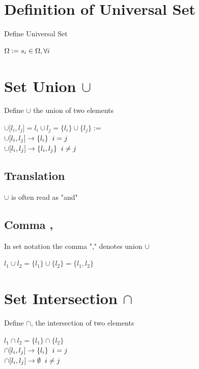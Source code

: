 \documentclass[11pt]{article}
\begin{document}
\section{Definition of Universal Set}
Define Universal Set
\begin{center}
$
\Omega := s_i \in \Omega, \forall i \hspace{5mm}
$
\end{center}





\section{Set Union $\cup$}
Define $\cup$ the union of two elements
\begin{center}
$\cup \lbrack l_i,l_j\rbrack = l_i \cup l_j = \{l_i\} \cup \{l_j\} :=$
\\ \vspace{2mm}
$\cup \lbrack l_i,l_j\rbrack \rightarrow \{l_i\} \hspace{2mm} i = j$
\\
$\cup \lbrack l_i,l_j\rbrack \rightarrow \{l_i,l_j\} \hspace{2mm} i \neq j$
\end{center}

\subsection{Translation}
$\cup$ is often read as "and"

\subsection{Comma ,}
In set notation the comma "," denotes union $\cup$
\begin{center}
$l_1 \cup l_2 = \{l_1\} \cup \{l_2\} = \{l_1,l_2\}$
\end{center}





\section{Set Intersection $\cap$}
Define $\cap$, the intersection of two elements
\begin{center}
$l_1 \cap l_2 = \{l_1\} \cap\{ l_2\}$
\\ \vspace{2mm}
$\cap \lbrack l_i,l_j\rbrack \rightarrow \{l_i\} \hspace{2mm} i = j$
\\
$\cap \lbrack l_i,l_j\rbrack \rightarrow \emptyset \hspace{2mm} i \neq j$
\end{center}
\end{document}
